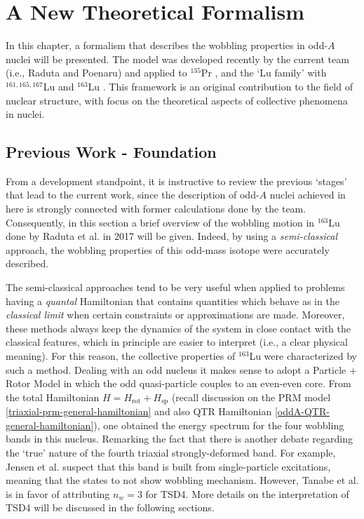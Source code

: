 \chapter{A New Theoretical Formalism}

In this chapter, a formalism that describes the wobbling properties in odd-$A$ nuclei will be presented. The model was developed recently by the current team (i.e., Raduta and Poenaru) and applied to $^{135}$Pr \cite{raduta2020new}, and the `Lu family' with $^{161,165,167}$Lu \cite{raduta2020approach} and $^{163}$Lu \cite{raduta2020approach,raduta2020towards,poenaru2021parity,poenaru2021extensive1,poenaru2021extensive2}. This framework is an original contribution to the field of nuclear structure, with focus on the theoretical aspects of collective phenomena in nuclei.

\section{Previous Work - Foundation}

From a development standpoint, it is instructive to review the previous `stages' that lead to the current work, since the description of odd-$A$ nuclei achieved in here is strongly connected with former calculations done by the team. Consequently, in this section a brief overview of the wobbling motion in $^{163}$Lu done by Raduta et al. in 2017 \cite{raduta2017semiclassical} will be given. Indeed, by using a \emph{semi-classical} approach, the wobbling properties of this odd-mass isotope were accurately described. 

The semi-classical approaches tend to be very useful when applied to problems having a \emph{quantal} Hamiltonian that contains quantities which behave as in the \emph{classical limit} when certain constraints or approximations are made. Moreover, these methods always keep the dynamics of the system in close contact with the classical features, which in principle are easier to interpret (i.e., a clear physical meaning). For this reason, the collective properties of $^{163}$Lu were characterized by such a method. Dealing with an odd nucleus it makes sense to adopt a Particle + Rotor Model in which the odd quasi-particle couples to an even-even core. From the total Hamiltonian $H=H_\text{rot}+H_\text{sp}$ (recall discussion on the PRM model \ref{triaxial-prm-general-hamiltonian} and also QTR Hamiltonian \ref{oddA-QTR-general-hamiltonian}), one obtained the energy spectrum for the four wobbling bands in this nucleus. Remarking the fact that there is another debate regarding the `true' nature of the fourth triaxial strongly-deformed band. For example, Jensen et al. \cite{jensen2004coexisting} suspect that this band is built from single-particle excitations, meaning that the states to not show wobbling mechanism. However, Tanabe et al. \cite{tanabe2008selection} is in favor of attributing $n_w=3$ for TSD4. More details on the interpretation of TSD4 will be discussed in the following sections.


